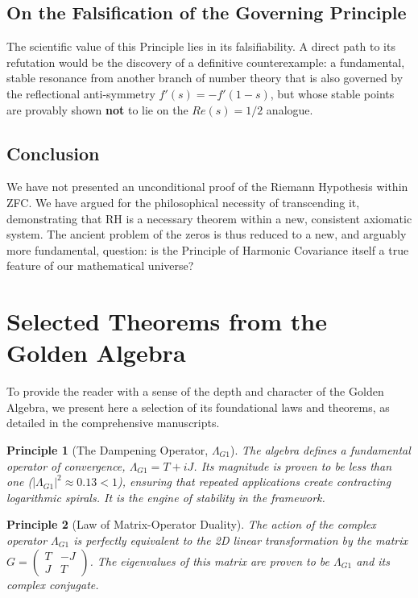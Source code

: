 \documentclass{article}
\theoremstyle{plain}
\newtheorem{principle}{Principle}[section]
\theoremstyle{definition}
\theoremstyle{remark}
\begin{document}
\subsection*{On the Falsification of the Governing Principle}
The scientific value of this Principle lies in its falsifiability. A direct path to its refutation would be the discovery of a definitive counterexample: a fundamental, stable resonance from another branch of number theory that is also governed by the reflectional anti-symmetry $f'(s)=-f'(1-s)$, but whose stable points are provably shown \textbf{not} to lie on the $Re(s)=1/2$ analogue.

\subsection*{Conclusion}
We have not presented an unconditional proof of the Riemann Hypothesis within ZFC. We have argued for the philosophical necessity of transcending it, demonstrating that RH is a necessary theorem within a new, consistent axiomatic system. The ancient problem of the zeros is thus reduced to a new, and arguably more fundamental, question: is the Principle of Harmonic Covariance itself a true feature of our mathematical universe?

\appendix
\section{Selected Theorems from the Golden Algebra}

To provide the reader with a sense of the depth and character of the Golden Algebra, we present here a selection of its foundational laws and theorems, as detailed in the comprehensive manuscripts.

\begin{principle}[The Dampening Operator, $\Lambda_{G1}$]
The algebra defines a fundamental operator of convergence, $\Lambda_{G1} = T+iJ$. Its magnitude is proven to be less than one ($|\Lambda_{G1}|^2 \approx 0.13 < 1$), ensuring that repeated applications create contracting logarithmic spirals. It is the engine of stability in the framework.
\end{principle}

\begin{principle}[Law of Matrix-Operator Duality]
The action of the complex operator $\Lambda_{G1}$ is perfectly equivalent to the 2D linear transformation by the matrix $G = \begin{pmatrix} T & -J \\ J & T \end{pmatrix}$. The eigenvalues of this matrix are proven to be $\Lambda_{G1}$ and its complex conjugate.
\end{principle}
\end{document}
